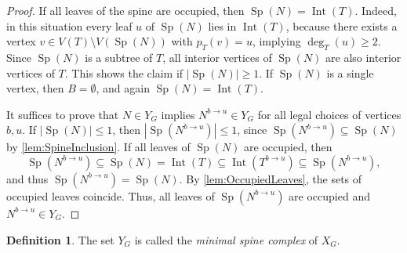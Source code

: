\documentclass[reqno,dvipsnames]{amsart}
\theoremstyle{plain}
\numberwithin{equation}{section}
\theoremstyle{definition}
\newtheorem{definition}[theorem]{Definition}
\DeclareMathOperator{\degree}{deg}
\DeclareMathOperator{\Int}{Int}
\DeclareMathOperator{\Sp}{Sp}
\begin{document}
\begin{proof}
	If all leaves of the spine are occupied, then $\Sp(N) = \Int(T)$. Indeed, in this situation every leaf $u$ of $\Sp(N)$ lies in $\Int(T)$, because there exists a vertex $v\in V(T)\setminus V(\Sp(N))$ with $p_T(v) = u$, implying $\degree_T(u) \geq 2$. Since $\Sp(N)$ is a subtree of $T$, all interior vertices of $\Sp(N)$ are also interior vertices of $T$. This shows the claim if $|\Sp(N)|\geq 1$. If $\Sp(N)$ is a single vertex, then $B = \emptyset$, and again $\Sp(N) = \Int(T)$.
	
	It suffices to prove that $N\in Y_G$ implies $N^{b\to u}\in Y_G$ for all legal choices of vertices $b,u$. If $|\Sp(N)|\leq 1$, then $|\Sp(N^{b\to u})|\leq 1$, since $\Sp(N^{b\to u}) \subseteq \Sp(N)$ by \autoref{lem:SpineInclusion}. If all leaves of $\Sp(N)$ are occupied, then 
	\[
	\Sp(N^{b\to u}) \subseteq \Sp(N) = \Int(T) \subseteq \Int(T^{b\to u}) \subseteq \Sp(N^{b\to u}),
	\] 
	and thus $\Sp(N^{b\to u}) = \Sp(N)$. By \autoref{lem:OccupiedLeaves}, the sets of occupied leaves coincide. Thus, all leaves of $\Sp(N^{b\to u})$ are occupied and $N^{b\to u} \in Y_G$.
\end{proof}

\begin{definition}
	The set $Y_G$ is called the \textit{minimal spine complex} of $X_G$.
\end{definition}
\end{document}
